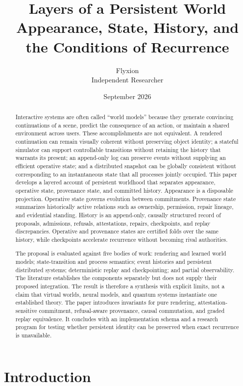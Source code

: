 \documentclass[11pt]{article}
\title{\textbf{Layers of a Persistent World}\\[4pt]\large Appearance, State, History, and the Conditions of Recurrence}
\author{Flyxion\\\small Independent Researcher}
\date{September 2026}
\begin{document}
\maketitle

\begin{abstract}
Interactive systems are often called ``world models'' because they generate convincing continuations of a scene, predict the consequence of an action, or maintain a shared environment across users. These accomplishments are not equivalent. A rendered continuation can remain visually coherent without preserving object identity; a stateful simulator can support controllable transitions without retaining the history that warrants its present; an append-only log can preserve events without supplying an efficient operative state; and a distributed snapshot can be globally consistent without corresponding to an instantaneous state that all processes jointly occupied. This paper develops a layered account of persistent worldhood that separates appearance, operative state, provenance state, and committed history. Appearance is a disposable projection. Operative state governs evolution between commitments. Provenance state summarizes historically active relations such as ownership, permission, repair lineage, and evidential standing. History is an append-only, causally structured record of proposals, admissions, refusals, attestations, repairs, checkpoints, and replay discrepancies. Operative and provenance states are certified folds over the same history, while checkpoints accelerate recurrence without becoming rival authorities.

The proposal is evaluated against five bodies of work: rendering and learned world models; state-transition and process semantics; event histories and persistent distributed systems; deterministic replay and checkpointing; and partial observability. The literature establishes the components separately but does not supply their proposed integration. The result is therefore a synthesis with explicit limits, not a claim that virtual worlds, neural models, and quantum systems instantiate one established theory. The paper introduces invariants for pure rendering, attestation-sensitive commitment, refusal-aware provenance, causal commutation, and graded replay equivalence. It concludes with an implementation schema and a research program for testing whether persistent identity can be preserved when exact recurrence is unavailable.
\end{abstract}

\section{Introduction}
\end{document}
